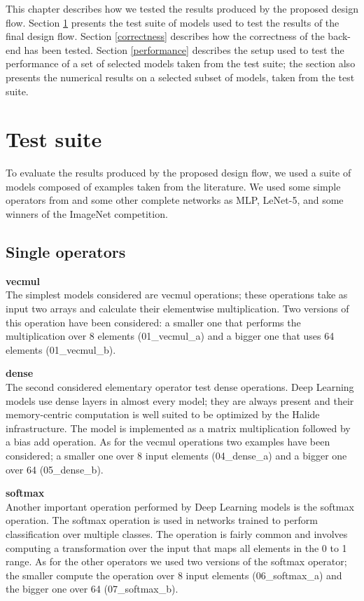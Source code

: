 \documentclass[../main.tex]{subfiles}
\begin{document}
This chapter describes how we tested the results produced by the proposed design flow.
Section \ref{test-suite} presents the test suite of models used to test the results of the final design flow.
Section \ref{correctness} describes how the correctness of the back-end has been tested.
Section \ref{performance} describes the setup used to test the performance of a set of selected models taken from the test suite; the section also presents the numerical results on a selected subset of models, taken from the test suite.

\newpage
\section{Test suite}
\label {test-suite}

To evaluate the results produced by the proposed design flow, we used a suite of models composed of examples taken from the literature.
We used some simple operators from \cite{noronha2018leflow} and some other complete networks as MLP, LeNet-5, and some winners of the ImageNet competition.

\subsection{Single operators}

\textbf{vecmul}\\
The simplest models considered are vecmul operations; these operations take as input two arrays and calculate their elementwise multiplication.
Two versions of this operation have been considered: a smaller one that performs the multiplication over 8 elements (01\_vecmul\_a) and a bigger one that uses 64 elements (01\_vecmul\_b).

\textbf{dense}\\
The second considered elementary operator test dense operations.
Deep Learning models use dense layers in almost every model; they are always present and their memory-centric computation is well suited to be optimized by the Halide infrastructure.
The model is implemented as a matrix multiplication followed by a bias add operation.
As for the vecmul operations two examples have been considered; a smaller one over 8 input elements (04\_dense\_a) and a bigger one over 64 (05\_dense\_b).

\textbf{softmax}\\
Another important operation performed by Deep Learning models is the softmax operation.
The softmax operation is used in networks trained to perform classification over multiple classes.
The operation is fairly common and involves computing a transformation over the input that maps all elements in the 0 to 1 range.
As for the other operators we used two versions of the softmax operator; the smaller compute the operation over 8 input elements (06\_softmax\_a) and the bigger one over 64 (07\_softmax\_b).
\end{document}
